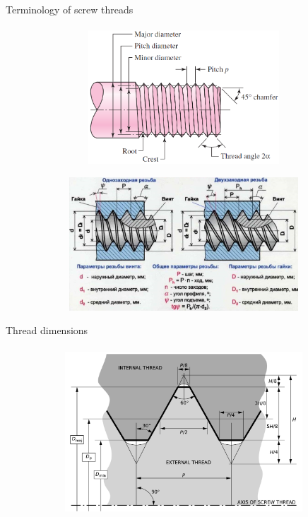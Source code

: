 \documentclass[aspectratio=169]{beamer}
\begin{document}
\begin{frame}[t]{Terminology of screw threads}
    \framesubtitle{}
    \begin{figure}[H]
        \begin{subfigure}{0.49\textwidth}
            \centering\includegraphics[height=5cm,width=1\textwidth,keepaspectratio]{screw_threads_terms.png}
            \label{fig:screw_threads_terms.png}
        \end{subfigure}
        \begin{subfigure}{0.49\textwidth}
            \centering\includegraphics[height=5cm,width=1\textwidth,keepaspectratio]{geom_thread_param_rus.jpeg}
            \label{fig:geom_thread_param_rus.jpeg}
        \end{subfigure}
    \end{figure}
\end{frame}

\begin{frame}[t]{Thread dimensions}
    \framesubtitle{}
    \vspace{-0.6cm}
    \begin{figure}[H]
        \centering\includegraphics[height=6cm,width=1\textwidth,keepaspectratio]{thread_dimensions.png}
        \label{fig:thread_dimensions.png}
    \end{figure}
\end{frame}
\end{document}
